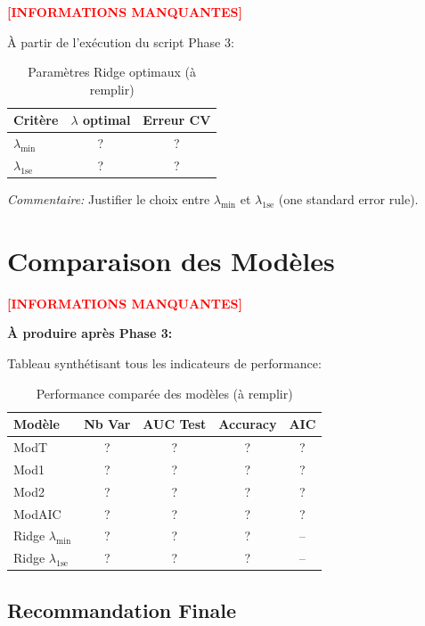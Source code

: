 \documentclass[11pt,a4paper,french]{report}
\begin{document}
\textcolor{red}{\textbf{[INFORMATIONS MANQUANTES]}}

À partir de l'exécution du script Phase 3:

\begin{table}[H]
\centering
\caption{Paramètres Ridge optimaux (à remplir)}
\begin{tabular}{|l|c|c|}
\hline
\textbf{Critère} & \textbf{$\lambda$ optimal} & \textbf{Erreur CV} \\
\hline
$\lambda_{\text{min}}$ & ? & ? \\
$\lambda_{\text{1se}}$ & ? & ? \\
\hline
\end{tabular}
\label{tab:lambda_optimal}
\end{table}

\textit{Commentaire:} Justifier le choix entre $\lambda_{\min}$ et $\lambda_{\text{1se}}$ (one standard error rule).

\section{Comparaison des Modèles}

\textcolor{red}{\textbf{[INFORMATIONS MANQUANTES]}}

\textbf{À produire après Phase 3:}

Tableau synthétisant tous les indicateurs de performance:

\begin{table}[H]
\centering
\caption{Performance comparée des modèles (à remplir)}
\begin{tabular}{|l|c|c|c|c|}
\hline
\textbf{Modèle} & \textbf{Nb Var} & \textbf{AUC Test} & \textbf{Accuracy} & \textbf{AIC} \\
\hline
ModT & ? & ? & ? & ? \\
Mod1 & ? & ? & ? & ? \\
Mod2 & ? & ? & ? & ? \\
ModAIC & ? & ? & ? & ? \\
Ridge $\lambda_{\min}$ & ? & ? & ? & -- \\
Ridge $\lambda_{\text{1se}}$ & ? & ? & ? & -- \\
\hline
\end{tabular}
\label{tab:model_comparison}
\end{table}

\subsection{Recommandation Finale}
\end{document}
